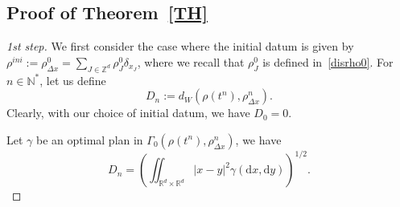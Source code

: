 \documentclass[11pt]{article}
\theoremstyle{definition}
\numberwithin{equation}{section}
\newcommand*{\dd}{\mathrm{d}}
\newcommand*{\dx}{\dd x}
\newcommand*{\dy}{\dd y}
\newcommand*\NN{\mathbb{N}}
\newcommand*\RR{\mathbb{R}}
\newcommand*\ZZ{\mathbb{Z}}
\newenvironment{step}[1]{\begin{proof}[#1]}{\let\qed\relax \end{proof}}
\begin{document}
\subsection{Proof of Theorem~\ref{TH}}

\begin{step}{1st step}
We first consider the case where the initial datum is given by $\rho^{ini}:=\rho_{\Delta x}^0 = \sum_{J\in\ZZ^d} \rho_J^0 \delta_{x_J}$, where we recall that $\rho_J^0$ is defined in~\eqref{disrho0}. For $n\in\NN^*$, let us define
\[
D_n:= d_W (\rho(t^n),\rho_{\Delta x}^n ).
\]
Clearly, with our choice of initial datum, we have $D_0=0$.

Let $\gamma$ be an optimal plan in $\Gamma_0(\rho(t^n),\rho_{\Delta x}^n)$, we have
\[
D_n = \left(\iint_{\RR^d\times\RR^d} |x-y|^2 \gamma(\dx,\dy)\right)^{1/2}.
\]


\end{step}
\end{document}
